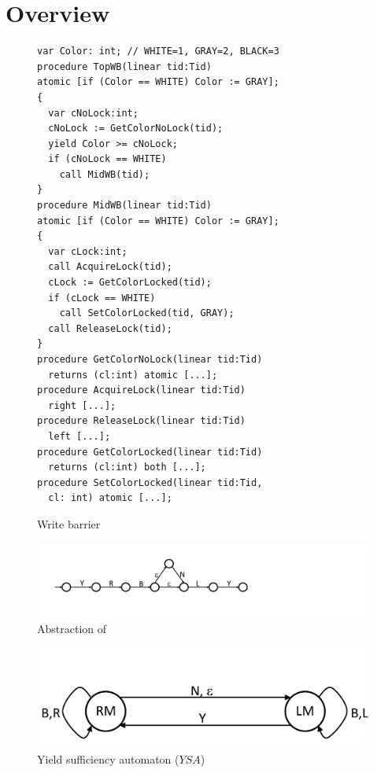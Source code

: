 \section{Overview}
\label{sec:overview}

\begin{figure} 
\begin{verbatim}
var Color: int; // WHITE=1, GRAY=2, BLACK=3
procedure TopWB(linear tid:Tid)
atomic [if (Color == WHITE) Color := GRAY];
{
  var cNoLock:int;
  cNoLock := GetColorNoLock(tid);
  yield Color >= cNoLock;
  if (cNoLock == WHITE) 
    call MidWB(tid);
}
procedure MidWB(linear tid:Tid)
atomic [if (Color == WHITE) Color := GRAY];
{
  var cLock:int;
  call AcquireLock(tid);
  cLock := GetColorLocked(tid);
  if (cLock == WHITE) 
    call SetColorLocked(tid, GRAY);
  call ReleaseLock(tid);
}
procedure GetColorNoLock(linear tid:Tid) 
  returns (cl:int) atomic [...];
procedure AcquireLock(linear tid:Tid) 
  right [...];
procedure ReleaseLock(linear tid:Tid) 
  left [...];
procedure GetColorLocked(linear tid:Tid) 
  returns (cl:int) both [...];
procedure SetColorLocked(linear tid:Tid, 
  cl: int) atomic [...];
\end{verbatim}
\caption{Write barrier}
\label{fig:reft}
\end{figure}

\begin{figure}
\begin{center}
\includegraphics[scale=0.35]{MidWB.pdf}
\end{center}
\caption{Abstraction of }
\label{fig:midwb}
\end{figure}

\begin{figure}
\begin{center}
\includegraphics[scale=0.35]{YieldTypeCheckingAutomaton.pdf}
\end{center}
\caption{Yield sufficiency automaton ($YSA$)}
\label{fig:ysa}
\end{figure}

